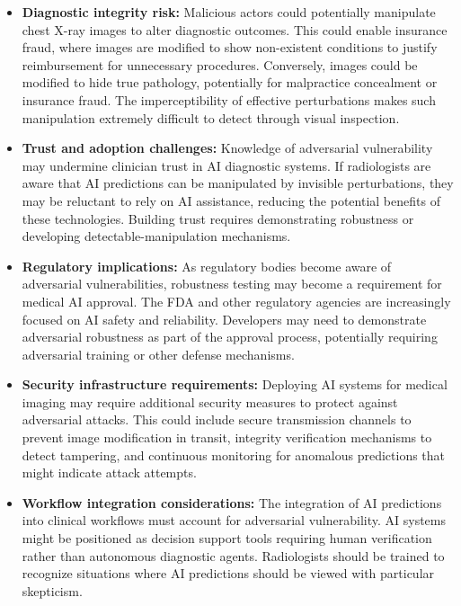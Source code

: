 \documentclass[12pt,a4paper]{article}
\begin{document}
\begin{itemize}[leftmargin=*]
    \item \textbf{Diagnostic integrity risk:} Malicious actors could potentially manipulate chest X-ray images to alter diagnostic outcomes. This could enable insurance fraud, where images are modified to show non-existent conditions to justify reimbursement for unnecessary procedures. Conversely, images could be modified to hide true pathology, potentially for malpractice concealment or insurance fraud. The imperceptibility of effective perturbations makes such manipulation extremely difficult to detect through visual inspection.

    \item \textbf{Trust and adoption challenges:} Knowledge of adversarial vulnerability may undermine clinician trust in AI diagnostic systems. If radiologists are aware that AI predictions can be manipulated by invisible perturbations, they may be reluctant to rely on AI assistance, reducing the potential benefits of these technologies. Building trust requires demonstrating robustness or developing detectable-manipulation mechanisms.

    \item \textbf{Regulatory implications:} As regulatory bodies become aware of adversarial vulnerabilities, robustness testing may become a requirement for medical AI approval. The FDA and other regulatory agencies are increasingly focused on AI safety and reliability. Developers may need to demonstrate adversarial robustness as part of the approval process, potentially requiring adversarial training or other defense mechanisms.

    \item \textbf{Security infrastructure requirements:} Deploying AI systems for medical imaging may require additional security measures to protect against adversarial attacks. This could include secure transmission channels to prevent image modification in transit, integrity verification mechanisms to detect tampering, and continuous monitoring for anomalous predictions that might indicate attack attempts.

    \item \textbf{Workflow integration considerations:} The integration of AI predictions into clinical workflows must account for adversarial vulnerability. AI systems might be positioned as decision support tools requiring human verification rather than autonomous diagnostic agents. Radiologists should be trained to recognize situations where AI predictions should be viewed with particular skepticism.
\end{itemize}
\end{document}
